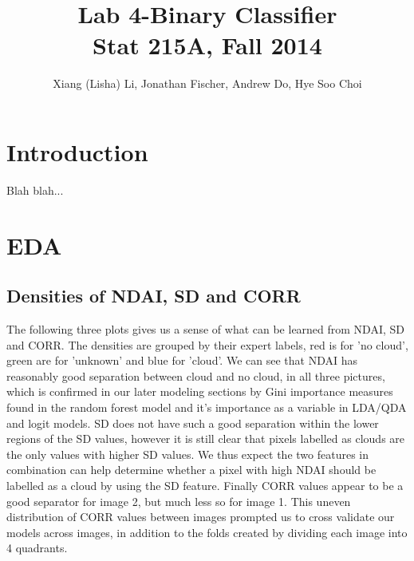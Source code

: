 \documentclass{article}\usepackage[]{graphicx}\usepackage[]{color}
\begin{document}
\title{Lab 4-Binary Classifier\\
Stat 215A, Fall 2014}

\author{Xiang (Lisha) Li, Jonathan Fischer, Andrew Do, Hye Soo Choi}

\maketitle

\section{Introduction}
Blah blah...

\section{EDA}
\subsection{Densities of NDAI, SD and CORR}

The following three plots gives us a sense of what can be learned from NDAI, SD and CORR.  The densities are grouped by their expert labels, red is for 'no cloud', green are for 'unknown' and blue for 'cloud'. We can see that NDAI has reasonably good separation between cloud and no cloud, in all three pictures, which is confirmed in our later modeling sections by Gini importance measures found in the random forest model and it's importance as a variable in LDA/QDA and logit models. SD does not have such a good separation within the lower regions of the SD values, however it is still clear that pixels labelled as clouds are the only values with higher SD values.  We thus expect the two features in combination can help determine whether a pixel with high NDAI should be labelled as a cloud by using the SD feature.  Finally CORR values appear to be a good separator for image 2, but much less so for image 1.  This uneven distribution of CORR values between images prompted us to cross validate our models across images, in addition to the folds created by dividing each image into 4 quadrants. 
\end{document}
